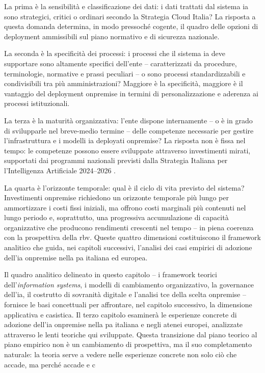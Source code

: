 La prima è la sensibilità e classificazione dei dati: i dati trattati dal sistema \gls{ia} sono strategici, critici o ordinari secondo la Strategia Cloud Italia? La risposta a questa domanda determina, in modo pressoché cogente, il quadro delle opzioni di deployment ammissibili sul piano normativo e di sicurezza nazionale.

La seconda è la specificità dei processi: i processi che il sistema \gls{ia} deve supportare sono altamente specifici dell'ente -- caratterizzati da procedure, terminologie, normative e prassi peculiari -- o sono processi standardizzabili e condivisibili tra più amministrazioni? Maggiore è la specificità, maggiore è il vantaggio del deployment \gls{onpremise} in termini di personalizzazione e aderenza ai processi istituzionali.

La terza è la maturità organizzativa: l'ente dispone internamente -- o è in grado di svilupparle nel breve-medio termine -- delle competenze necessarie per gestire l'infrastruttura e i modelli \gls{ia} deployati \gls{onpremise}? La risposta non è fissa nel tempo: le competenze possono essere sviluppate attraverso investimenti mirati, supportati dai programmi nazionali previsti dalla Strategia Italiana per l'Intelligenza Artificiale 2024--2026 \parencite{ProgrammaStrategicoIA}.

La quarta è l'orizzonte temporale: qual è il ciclo di vita previsto del sistema? Investimenti \gls{onpremise} richiedono un orizzonte temporale più lungo per ammortizzare i costi fissi iniziali, ma offrono costi marginali più contenuti nel lungo periodo e, soprattutto, una progressiva accumulazione di capacità organizzative che producono rendimenti crescenti nel tempo -- in piena coerenza con la prospettiva della \gls{rbv}. Queste quattro dimensioni costituiscono il framework analitico che guida, nei capitoli successivi, l'analisi dei casi empirici di adozione dell'\gls{ia} \gls{onpremise} nella \gls{pa} italiana ed europea.


Il quadro analitico delineato in questo capitolo -- i framework teorici dell'\textit{information systems}, i modelli di cambiamento organizzativo, la governance dell'\gls{ia}, il costrutto di sovranità digitale e l'analisi \gls{tce} della scelta \gls{onpremise} -- fornisce le basi concettuali per affrontare, nel capitolo successivo, la dimensione applicativa e casistica. Il terzo capitolo esaminerà le esperienze concrete di adozione dell'\gls{ia} \gls{onpremise} nella \gls{pa} italiana e negli atenei europei, analizzate attraverso le lenti teoriche qui sviluppate. Questa transizione dal piano teorico al piano empirico non è un cambiamento di prospettiva, ma il suo completamento naturale: la teoria serve a vedere nelle esperienze concrete non solo ciò che accade, ma perché accade e c